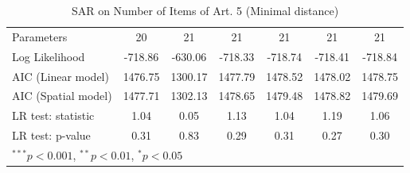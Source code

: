 \begin{table}[!h]
\begin{center}
\begin{tabular}{l c c c c c c }
Parameters              & 20           & 21           & 21           & 21           & 21           & 21           \\
Log Likelihood          & -718.86      & -630.06      & -718.33      & -718.74      & -718.41      & -718.84      \\
AIC (Linear model)      & 1476.75      & 1300.17      & 1477.79      & 1478.52      & 1478.02      & 1478.75      \\
AIC (Spatial model)     & 1477.71      & 1302.13      & 1478.65      & 1479.48      & 1478.82      & 1479.69      \\
LR test: statistic      & 1.04         & 0.05         & 1.13         & 1.04         & 1.19         & 1.06         \\
LR test: p-value        & 0.31         & 0.83         & 0.29         & 0.31         & 0.27         & 0.30         \\
\bottomrule
\multicolumn{7}{l}{\scriptsize{$^{***}p<0.001$, $^{**}p<0.01$, $^*p<0.05$}}
\end{tabular}
\caption{SAR on Number of Items of Art. 5 (Minimal distance)}
\label{table:coefficients}
\end{center}
\end{table}
